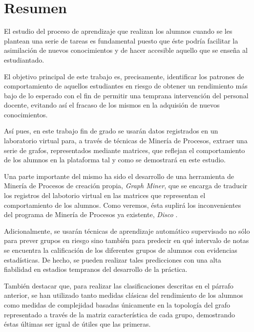 \chapter*{Resumen}


El estudio del proceso de aprendizaje que realizan los alumnos cuando se les plantean una serie de tareas es fundamental puesto que éste podría facilitar la asimilación de nuevos conocimientos y de hacer accesible aquello que se enseña al estudiantado.

El objetivo principal de este trabajo es, precisamente, identificar los patrones de comportamiento de aquellos estudiantes en riesgo de obtener un rendimiento más bajo de lo esperado con el fin de permitir una temprana intervención del personal docente, evitando así el fracaso de los mismos en la adquisión de nuevos conocimientos.

Así pues, en este trabajo fin de grado se usarán datos registrados en un laboratorio virtual para, a través de técnicas de Minería de Procesos, extraer una serie de grafos, representados mediante matrices, que reflejan el comportamiento de los alumnos en la plataforma tal y como se demostrará en este estudio.

Una parte importante del mismo ha sido el desarrollo de una herramienta de Minería de Procesos de creación propia, \emph{Graph Miner}, que se encarga de traducir los registros del labotorio virtual en las matrices que representan el comportamiento de los alumnos. Como veremos, ésta suplirá los inconvenientes del programa de Minería de Procesos ya existente, \emph{Disco} \cite{gunther2012disco}.

Adicionalmente, se usarán técnicas de aprendizaje automático supervisado no sólo para prever grupos en riesgo sino también para predecir en qué intervalo de notas se encuentra la calificación de los diferentes grupos de alumnos con evidencias estadísticas. De hecho, se pueden realizar tales predicciones con una alta fiabilidad en estadios tempranos del desarrollo de la práctica.

También destacar que, para realizar las clasificaciones descritas en el párrafo anterior, se han utilizado tanto medidas clásicas del rendimiento de los alumnos como medidas de complejidad basadas únicamente en la topología del grafo representado a través de la matriz característica de cada grupo, demostrando éstas últimas ser igual de útiles que las primeras.

